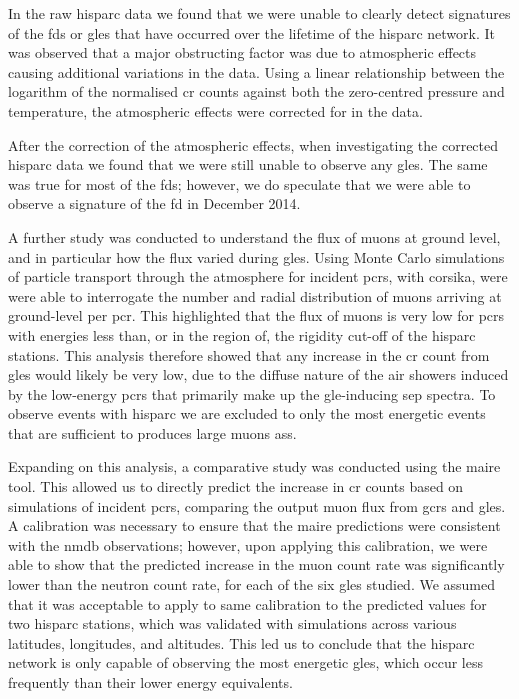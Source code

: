 In the raw \gls{hisparc} data we found that we were unable to clearly detect signatures of the \glspl{fd} or \glspl{gle} that have occurred over the lifetime of the \gls{hisparc} network. It was observed that a major obstructing factor was due to atmospheric effects causing additional variations in the data. Using a linear relationship between the logarithm of the normalised \gls{cr} counts against both the zero-centred pressure and temperature, the atmospheric effects were corrected for in the data.

After the correction of the atmospheric effects, when investigating the corrected \gls{hisparc} data we found that we were still unable to observe any \glspl{gle}. The same was true for most of the \glspl{fd}; however, we do speculate that we were able to observe a signature of the \gls{fd} in December 2014. 

A further study was conducted to understand the flux of muons at ground level, and in particular how the flux varied during \glspl{gle}. Using Monte Carlo simulations of particle transport through the atmosphere for incident \glspl{pcr}, with \gls{corsika}, were were able to interrogate the number and radial distribution of muons arriving at ground-level per \gls{pcr}. This highlighted that the flux of muons is very low for \glspl{pcr} with energies less than, or in the region of, the rigidity cut-off of the \gls{hisparc} stations. This analysis therefore showed that any increase in the \gls{cr} count from \glspl{gle} would likely be very low, due to the diffuse nature of the air showers induced by the low-energy \glspl{pcr} that primarily make up the \gls{gle}-inducing \gls{sep} spectra. To observe events with \gls{hisparc} we are excluded to only the most energetic events that are sufficient to produces large muons \glspl{as}.

Expanding on this analysis, a comparative study was conducted using the \gls{maire} tool. This allowed us to directly predict the increase in \gls{cr} counts based on simulations of incident \glspl{pcr}, comparing the output muon flux from \glspl{gcr} and \glspl{gle}. A calibration was necessary to ensure that the \gls{maire} predictions were consistent with the \gls{nmdb} observations; however, upon applying this calibration, we were able to show that the predicted increase in the muon count rate was significantly lower than the neutron count rate, for each of the six \glspl{gle} studied. We assumed that it was acceptable to apply to same calibration to the predicted values for two \gls{hisparc} stations, which was validated with simulations across various latitudes, longitudes, and altitudes. This led us to conclude that the \gls{hisparc} network is only capable of observing the most energetic \glspl{gle}, which occur less frequently than their lower energy equivalents.

